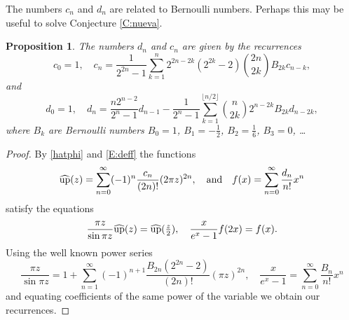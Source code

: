 \documentclass[10pt]{amsart}
\newtheorem{prop}[thm]{Proposition}
\theoremstyle{definition}
\theoremstyle{remark}
\begin{document}
The numbers $c_n$ and $d_n$ are related to Bernoulli numbers. Perhaps this
may be useful to solve  Conjecture \ref{C:nueva}.

\begin{prop}
The numbers $d_n$ and $c_n$ are given by the recurrences
\begin{equation}\label{Bncn}
c_0=1,\quad c_n=\frac{1}{2^{2n}-1}\sum_{k=1}^n 2^{2n-2k}(2^{2k}-2)\binom{2n}{2k}
B_{2k}c_{n-k},
\end{equation}
and
\begin{equation}\label{Bndn}
d_0=1,\quad d_n=\frac{n 2^{n-2}}{2^n-1} d_{n-1}-\frac{1}{2^n-1}
\sum_{k=1}^{\lfloor n/2\rfloor}\binom{n}{2k}2^{n-2k}B_{2k} d_{n-2k},
\end{equation}
where $B_k$ are Bernoulli numbers $B_0=1$, $B_1=-\frac12$, $B_2=\frac16$, $B_3=0$,  \dots
\end{prop}

\begin{proof}
By \eqref{hatphi} and \eqref{E:deff} the functions
\[\widehat{\operatorname{up}}(z)=\sum_{n=0}^\infty (-1)^n \frac{c_n}{(2n)!} (2\pi z)^{2n},\quad
\text{and}\quad f(x)=\sum_{n=0}^\infty \frac{d_n}{n!}x^n\]
satisfy the equations
\[\frac{\pi z}{\sin\pi z}\widehat{\operatorname{up}}(z)=\widehat{\operatorname{up}}(\tfrac{z}{2}),\quad
\frac{x}{e^x-1}f(2x)=f(x).\]
Using the well known power series
\[\frac{\pi z}{\sin\pi z}=1+\sum_{n=1}^\infty(-1)^{n+1}\frac{B_{2n}(2^{2n}-2)}{(2n)!}(\pi z)^{2n},\quad \frac{x}{e^x-1}=\sum_{n=0}^\infty \frac{B_n}{n!} x^n\]
and equating coefficients of the same power of the variable we obtain our
recurrences.
\end{proof}
\end{document}
